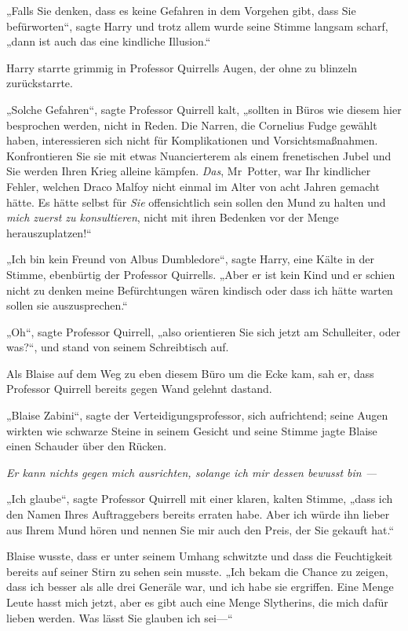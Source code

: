 {„Falls Sie denken, dass es keine Gefahren in dem Vorgehen gibt, dass Sie befürworten“, sagte Harry und trotz allem wurde seine Stimme langsam scharf, „dann ist auch das eine kindliche Illusion.“

Harry starrte grimmig in Professor Quirrells Augen, der ohne zu blinzeln zurückstarrte.

„Solche Gefahren“, sagte Professor Quirrell kalt, „sollten in Büros wie diesem hier besprochen werden, nicht in Reden. Die Narren, die Cornelius Fudge gewählt haben, interessieren sich nicht für Komplikationen und Vorsichtsmaßnahmen. Konfrontieren Sie sie mit etwas Nuancierterem als einem frenetischen Jubel und Sie werden Ihren Krieg alleine kämpfen. \emph{Das}, Mr~Potter, war Ihr kindlicher Fehler, welchen Draco Malfoy nicht einmal im Alter von acht Jahren gemacht hätte. Es hätte selbst für \emph{Sie} offensichtlich sein sollen den Mund zu halten und \emph{mich zuerst zu konsultieren}, nicht mit ihren Bedenken vor der Menge herauszuplatzen!“

„Ich bin kein Freund von Albus Dumbledore“, sagte Harry, eine Kälte in der Stimme, ebenbürtig der Professor Quirrells. „Aber er ist kein Kind und er schien nicht zu denken meine Befürchtungen wären kindisch oder dass ich hätte warten sollen sie auszusprechen.“

„Oh“, sagte Professor Quirrell, „also orientieren Sie sich jetzt am Schulleiter, oder was?“, und stand von seinem Schreibtisch auf.

Als Blaise auf dem Weg zu eben diesem Büro um die Ecke kam, sah er, dass Professor Quirrell bereits gegen Wand gelehnt dastand.

„Blaise Zabini“, sagte der Verteidigungsprofessor, sich aufrichtend; seine Augen wirkten wie schwarze Steine in seinem Gesicht und seine Stimme jagte Blaise einen Schauder über den Rücken.

\emph{Er kann nichts gegen mich ausrichten, solange ich mir dessen bewusst bin —}

„Ich glaube“, sagte Professor Quirrell mit einer klaren, kalten Stimme, „dass ich den Namen Ihres Auftraggebers bereits erraten habe. Aber ich würde ihn lieber aus Ihrem Mund hören und nennen Sie mir auch den Preis, der Sie gekauft hat.“

Blaise wusste, dass er unter seinem Umhang schwitzte und dass die Feuchtigkeit bereits auf seiner Stirn zu sehen sein musste. „Ich bekam die Chance zu zeigen, dass ich besser als alle drei Generäle war, und ich habe sie ergriffen. Eine Menge Leute hasst mich jetzt, aber es gibt auch eine Menge Slytherins, die mich dafür lieben werden. Was lässt Sie glauben ich sei—“

}
